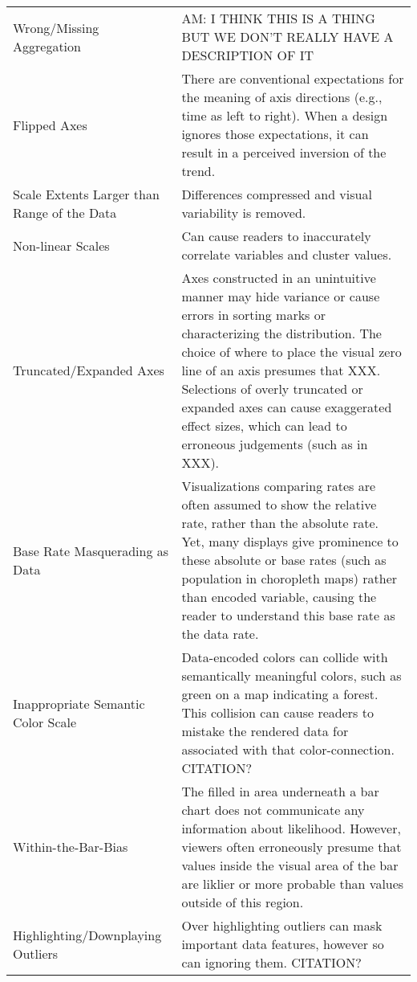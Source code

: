 \begin{longtable}{p{3cm}p{14cm}}
 \rowcolor{colorc}Wrong/Missing Aggregation & AM: I THINK THIS IS A THING BUT WE DON'T REALLY HAVE A DESCRIPTION OF IT \\
 \rowcolor{colorc-opaque}Flipped Axes  & There are conventional expectations for the meaning of axis directions (e.g., time as left to right). When a design ignores those expectations, it can result in a perceived inversion of the trend.  \cite{pandey2015deceptive, correll2017black}\\
 \rowcolor{colorc}Scale Extents Larger than Range of the Data & Differences compressed and visual variability is removed. \cite{cleveland1982variables}\\
 \rowcolor{colorc-opaque}Non-linear Scales & Can cause readers to inaccurately correlate variables and cluster values. \cite{pandey2015deceptive}\\
 \rowcolor{colorc}Truncated/Expanded Axes & Axes constructed in an unintuitive manner may hide variance or cause errors in sorting marks or characterizing the distribution.  The choice of where to place the visual zero line of an axis presumes that XXX. Selections of overly truncated or expanded axes can cause exaggerated effect sizes, which can lead to erroneous judgements (such as in XXX).  \cite{pandey2015deceptive, correll2017black, cleveland1982variables, ritchie2019lie, correll2019truncating}\\
 \rowcolor{colorc-opaque}Base Rate Masquerading as Data  & Visualizations comparing rates are often assumed to show the relative rate, rather than the absolute rate. Yet, many displays give prominence to these absolute or base rates (such as population in choropleth maps) rather than encoded variable, causing the reader to understand this base rate as the data rate.  \cite{correll2016surprise}\\
 \rowcolor{colorc}Inappropriate Semantic Color Scale  & Data-encoded colors can collide with semantically meaningful colors, such as green on a map indicating a forest. This collision can cause readers to mistake the rendered data for associated with that color-connection. CITATION?\\
 \rowcolor{colorc-opaque}Within-the-Bar-Bias & The filled in area underneath a bar chart does not communicate any information about likelihood. However, viewers often erroneously presume that values inside the visual area of the bar are liklier or more probable than values outside of this region. \cite{newman2012bar}\\
 \rowcolor{colorc}Highlighting/Downplaying Outliers & Over highlighting outliers can mask important data features, however so can ignoring them. CITATION?\\

\end{longtable}
